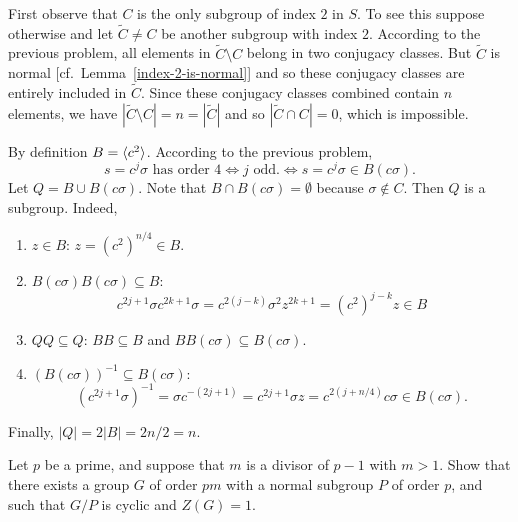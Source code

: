 \begin{solution} First observe that $C$ is the only subgroup of index $2$ in $S$. To see this suppose otherwise and let $\tilde C\ne C$ be another subgroup with index $2$. According to the previous problem, all elements in $\tilde C\setminus C$ belong in two conjugacy classes. But $\tilde C$ is normal [cf.~Lemma~\ref{index-2-is-normal}] and so these conjugacy classes are entirely included in $\tilde C$. Since these conjugacy classes combined contain $n$ elements, we have $|\tilde C\setminus C|=n=|\tilde C|$ and so $|\tilde C\cap C|=0$, which is impossible.

By definition $B=\langle c^2\rangle$. According to the previous problem,
$$
    s=c^j\sigma\text{ has order }4 \iff j \text{ odd.}\iff s=c^j\sigma\in B(c\sigma).
$$
Let $Q=B\cup B(c\sigma)$. Note that $B\cap B(c\sigma)=\emptyset$ because $\sigma\notin C$. Then $Q$ is a subgroup. Indeed,
\begin{enumerate}[-]
    \item $z\in B$: $z=(c^2)^{n/4}\in B$.
    \item $B(c\sigma)B(c\sigma)\subseteq B$:
    $$
        c^{2j+1}\sigma c^{2k+1}\sigma = c^{2(j-k)}\sigma^2z^{2k+1}
            = (c^2)^{j-k}z \in B
    $$
    \item $QQ\subseteq Q$: $BB\subseteq B$ and $BB(c\sigma)\subseteq B(c\sigma)$.
    \item $(B(c\sigma))^{-1}\subseteq B(c\sigma)$:
    $$
        (c^{2j+1}\sigma)^{-1}=\sigma c^{-(2j+1)}=c^{2j+1}\sigma z
        = c^{2(j+n/4)}c\sigma\in B(c\sigma).
    $$
\end{enumerate}
Finally, $|Q|=2|B|=2n/2=n$.  \end{solution}

\begin{probl}\label{problem-3.A.3}
    Let\/ $p$ be a prime, and suppose that\/ $m$ is a divisor of\/ $p-1$ with\/ $m>1$. Show that there exists a group\/ $G$ of order\/ $pm$ with a normal subgroup\/ $P$ of order\/ $p$, and such that\/ $G/P$ is cyclic and\/ $Z(G) = 1$.
\end{probl}

